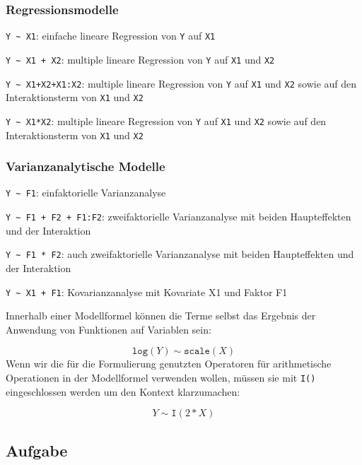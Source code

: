 \documentclass[
]{book}
\begin{document}
\hypertarget{regressionsmodelle}{%
\subsubsection{Regressionsmodelle}\label{regressionsmodelle}}

\texttt{Y\ \textasciitilde{}\ X1}: einfache lineare Regression von \texttt{Y} auf \texttt{X1}

\texttt{Y\ \textasciitilde{}\ X1\ +\ X2}: multiple lineare Regression von \texttt{Y} auf \texttt{X1} und \texttt{X2}

\texttt{Y\ \textasciitilde{}\ X1+X2+X1:X2}: multiple lineare Regression von \texttt{Y} auf \texttt{X1} und \texttt{X2} sowie auf den Interaktionsterm von \texttt{X1} und \texttt{X2}

\texttt{Y\ \textasciitilde{}\ X1*X2}: multiple lineare Regression von \texttt{Y} auf \texttt{X1} und \texttt{X2} sowie auf den Interaktionsterm von \texttt{X1} und \texttt{X2}

\hypertarget{varianzanalytische-modelle}{%
\subsubsection{Varianzanalytische Modelle}\label{varianzanalytische-modelle}}

\texttt{Y\ \textasciitilde{}\ F1}: einfaktorielle Varianzanalyse

\texttt{Y\ \textasciitilde{}\ F1\ +\ F2\ +\ F1:F2}: zweifaktorielle Varianzanalyse mit beiden Haupteffekten und der Interaktion

\texttt{Y\ \textasciitilde{}\ F1\ *\ F2}: auch zweifaktorielle Varianzanalyse mit beiden Haupteffekten und der Interaktion

\texttt{Y\ \textasciitilde{}\ X1\ +\ F1}: Kovarianzanalyse mit Kovariate X1 und Faktor F1

Innerhalb einer Modellformel können die Terme selbst das Ergebnis der Anwendung von Funktionen auf Variablen sein:

\[\texttt{log}(Y) \sim \texttt{scale}(X)\]
Wenn wir die für die Formulierung genutzten Operatoren für arithmetische Operationen in der Modellformel verwenden wollen, müssen sie mit \texttt{I()} eingeschlossen werden um den Kontext klarzumachen:

\[Y \sim \texttt{I}(2*X)\]

\hypertarget{aufgabe}{%
\subsection{Aufgabe}\label{aufgabe}}
\end{document}
